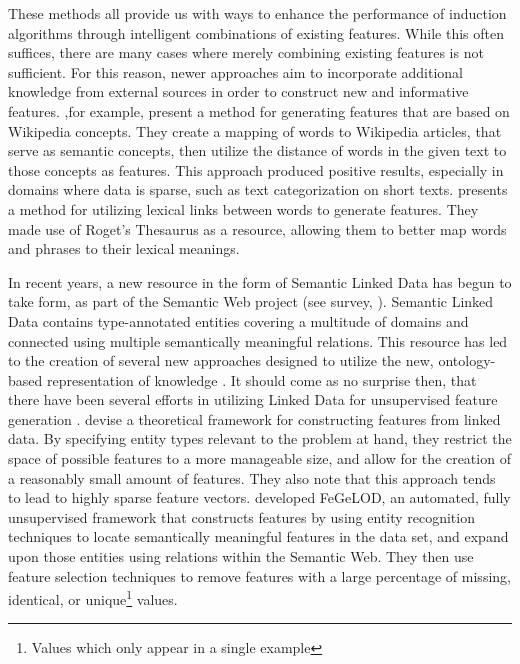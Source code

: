 \documentclass[twoside,11pt]{article}
\theoremstyle{definition}
\begin{document}
These methods all provide us with ways to enhance the performance of induction algorithms through intelligent combinations of existing features. While this often suffices, there are many cases where merely combining existing features is not sufficient. For this reason, newer approaches aim to incorporate additional knowledge from external sources in order to construct new and informative features.
 ,for example, present a method for generating features that are based on Wikipedia concepts. They create a mapping of words to Wikipedia articles, that serve as semantic concepts, then utilize the distance of words in the given text to those concepts as features. This approach produced positive results, especially in domains where data is sparse, such as text categorization on short texts.
 presents a method for utilizing lexical links between words to generate features. They made use of Roget's Thesaurus as a resource, allowing them to better map words and phrases to their lexical meanings.

In recent years, a new resource in the form of Semantic Linked Data has begun to take form, as part of the Semantic Web project (see survey, ). Semantic Linked Data contains type-annotated entities covering a multitude of domains and connected using multiple semantically meaningful relations.
This resource has led to the creation of several new approaches designed to utilize the new, ontology-based representation of knowledge \cite{losch2012graph,rios2014statistical}.
It should come as no surprise then, that there have been several efforts in utilizing Linked Data for unsupervised feature generation \cite{cheng2011automatedfull,paulheim2012unsupervisedfull}.  devise a theoretical framework for constructing features from linked data. By specifying entity types relevant to the problem at hand, they restrict the space of possible features to a more manageable size, and allow for the creation of a reasonably small amount of features. They also note that this approach tends to lead to highly sparse feature vectors.
 developed FeGeLOD, an automated, fully unsupervised framework that constructs features by using entity recognition techniques to locate semantically meaningful features in the data set, and expand upon those entities using relations within the Semantic Web. They then use feature selection techniques to remove features with a large percentage of missing, identical, or unique\footnote{Values which only appear in a single example} values. 
\end{document}
